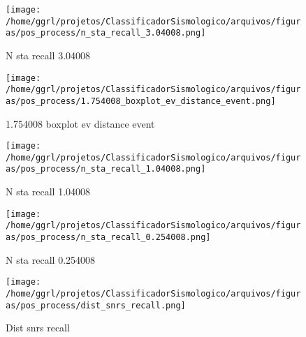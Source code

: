                     \begin{figure}[H]
                        \centering
                        \texttt{[image: /home/ggrl/projetos/ClassificadorSismologico/arquivos/figuras/pos\_process/n\_sta\_recall\_3.04008.png]}
                        \caption{N sta recall 3.04008}
                        \label{fig:n_sta_recall_3.04008}
                    \end{figure}
                

                    \begin{figure}[H]
                        \centering
                        \texttt{[image: /home/ggrl/projetos/ClassificadorSismologico/arquivos/figuras/pos\_process/1.754008\_boxplot\_ev\_distance\_event.png]}
                        \caption{1.754008 boxplot ev distance event}
                        \label{fig:1.754008_boxplot_ev_distance_event}
                    \end{figure}
                

                    \begin{figure}[H]
                        \centering
                        \texttt{[image: /home/ggrl/projetos/ClassificadorSismologico/arquivos/figuras/pos\_process/n\_sta\_recall\_1.04008.png]}
                        \caption{N sta recall 1.04008}
                        \label{fig:n_sta_recall_1.04008}
                    \end{figure}
                

                    \begin{figure}[H]
                        \centering
                        \texttt{[image: /home/ggrl/projetos/ClassificadorSismologico/arquivos/figuras/pos\_process/n\_sta\_recall\_0.254008.png]}
                        \caption{N sta recall 0.254008}
                        \label{fig:n_sta_recall_0.254008}
                    \end{figure}
                

                    \begin{figure}[H]
                        \centering
                        \texttt{[image: /home/ggrl/projetos/ClassificadorSismologico/arquivos/figuras/pos\_process/dist\_snrs\_recall.png]}
                        \caption{Dist snrs recall}
                        \label{fig:dist_snrs_recall}
                    \end{figure}
                

